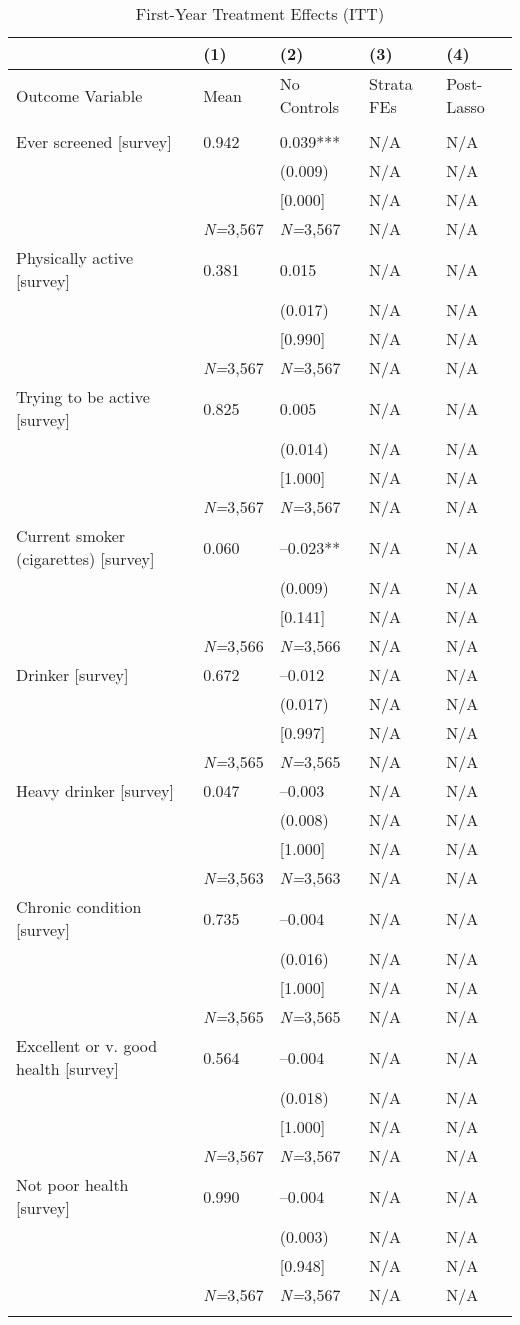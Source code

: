 \documentclass{article}
\begin{document}
\setlength{\tabcolsep}{6pt}
\begin{table}[tbp] \centering
{}

\caption{First-Year Treatment Effects (ITT)}
\label{tab:appendix_itt_health_vars_survey_0816_0717}
{\scriptsize
\begin{tabularx}{\linewidth}{lCCCC}

\toprule
&{(1)}&{(2)}&{(3)}&{(4)} \tabularnewline \midrule
{Outcome Variable}&{Mean}&{No Controls}&{Strata FEs}&{Post-Lasso} \tabularnewline
\midrule 
\addlinespace[1.2ex]
 \tabularnewline
\midrule Ever screened [survey]&0.942&0.039***&N/A&N/A \tabularnewline
&&(0.009)&N/A&N/A \tabularnewline
&&[0.000]&N/A&N/A \tabularnewline
&\textit{N=}3,567&\textit{N=}3,567&N/A&N/A \tabularnewline
\addlinespace[1.2ex]
Physically active [survey]&0.381&0.015&N/A&N/A \tabularnewline
&&(0.017)&N/A&N/A \tabularnewline
&&[0.990]&N/A&N/A \tabularnewline
&\textit{N=}3,567&\textit{N=}3,567&N/A&N/A \tabularnewline
\addlinespace[1.2ex]
Trying to be active [survey]&0.825&0.005&N/A&N/A \tabularnewline
&&(0.014)&N/A&N/A \tabularnewline
&&[1.000]&N/A&N/A \tabularnewline
&\textit{N=}3,567&\textit{N=}3,567&N/A&N/A \tabularnewline
\addlinespace[1.2ex]
Current smoker (cigarettes) [survey]&0.060&--0.023**&N/A&N/A \tabularnewline
&&(0.009)&N/A&N/A \tabularnewline
&&[0.141]&N/A&N/A \tabularnewline
&\textit{N=}3,566&\textit{N=}3,566&N/A&N/A \tabularnewline
\addlinespace[1.2ex]
Drinker [survey]&0.672&--0.012&N/A&N/A \tabularnewline
&&(0.017)&N/A&N/A \tabularnewline
&&[0.997]&N/A&N/A \tabularnewline
&\textit{N=}3,565&\textit{N=}3,565&N/A&N/A \tabularnewline
\addlinespace[1.2ex]
Heavy drinker [survey]&0.047&--0.003&N/A&N/A \tabularnewline
&&(0.008)&N/A&N/A \tabularnewline
&&[1.000]&N/A&N/A \tabularnewline
&\textit{N=}3,563&\textit{N=}3,563&N/A&N/A \tabularnewline
\addlinespace[1.2ex]
Chronic condition [survey]&0.735&--0.004&N/A&N/A \tabularnewline
&&(0.016)&N/A&N/A \tabularnewline
&&[1.000]&N/A&N/A \tabularnewline
&\textit{N=}3,565&\textit{N=}3,565&N/A&N/A \tabularnewline
\addlinespace[1.2ex]
Excellent or v. good health [survey]&0.564&--0.004&N/A&N/A \tabularnewline
&&(0.018)&N/A&N/A \tabularnewline
&&[1.000]&N/A&N/A \tabularnewline
&\textit{N=}3,567&\textit{N=}3,567&N/A&N/A \tabularnewline
\addlinespace[1.2ex]
Not poor health [survey]&0.990&--0.004&N/A&N/A \tabularnewline
&&(0.003)&N/A&N/A \tabularnewline
&&[0.948]&N/A&N/A \tabularnewline
&\textit{N=}3,567&\textit{N=}3,567&N/A&N/A \tabularnewline
\addlinespace[1.2ex]

\end{tabularx}}
\end{table}
\end{document}
